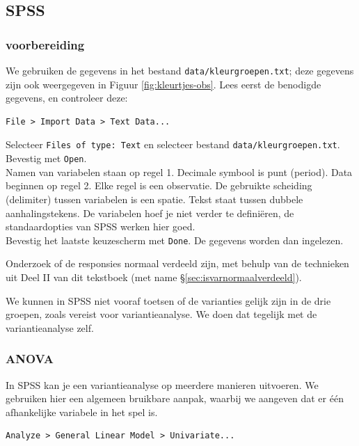 \documentclass[
]{book}
\begin{document}
\hypertarget{spss-12}{%
\subsection{SPSS}\label{spss-12}}

\hypertarget{voorbereiding}{%
\subsubsection{voorbereiding}\label{voorbereiding}}

We gebruiken de gegevens in het bestand \texttt{data/kleurgroepen.txt}; deze gegevens zijn ook weergegeven in Figuur \ref{fig:kleurtjes-obs}.
Lees eerst de benodigde gegevens, en controleer deze:

\begin{verbatim}
File > Import Data > Text Data...
\end{verbatim}

Selecteer \texttt{Files\ of\ type:\ Text} en selecteer bestand
\texttt{data/kleurgroepen.txt}. Bevestig met \texttt{Open}.\\
Namen van variabelen staan op regel 1. Decimale symbool is punt
(period). Data beginnen op regel 2. Elke regel is een observatie. De
gebruikte scheiding (delimiter) tussen variabelen is een spatie. Tekst
staat tussen dubbele aanhalingstekens. De variabelen hoef je niet verder
te definiëren, de standaardopties van SPSS werken hier goed.\\
Bevestig het laatste keuzescherm met \texttt{Done}. De gegevens
worden dan ingelezen.

Onderzoek of de responsies normaal verdeeld zijn, met behulp van de
technieken uit Deel II van dit tekstboek (met name
§\ref{sec:isvarnormaalverdeeld}).

We kunnen in SPSS niet vooraf toetsen of de varianties gelijk zijn in de
drie groepen, zoals vereist voor variantieanalyse. We doen dat tegelijk
met de variantieanalyse zelf.

\hypertarget{anova}{%
\subsubsection{ANOVA}\label{anova}}

In SPSS kan je een variantieanalyse op meerdere manieren uitvoeren. We
gebruiken hier een algemeen bruikbare aanpak, waarbij we aangeven dat er
één afhankelijke variabele in het spel is.\\

\begin{verbatim}
Analyze > General Linear Model > Univariate...
\end{verbatim}
\end{document}
